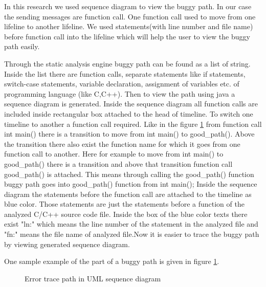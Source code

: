 In this research we used sequence diagram to view the buggy path. In our case the sending messages are function call. One function call used to move from one lifeline to another lifeline. We used statements(with line number and file name) before function call into the lifeline which will help the user to view the buggy path easily.

Through the static analysis engine buggy path can be found as a list of string. Inside the list there are function calls, separate statements like if statements, switch-case statements, variable declaration, assignment of variables etc. of programming language (like C,C++). Then to view the path using java a sequence diagram is generated. Inside the sequence diagram all function calls are included inside rectangular box attached to the head of timeline. To switch one timeline to another a function call required. Like in the figure \ref{Error_trace_path} from function call int main() there is a transition to move from int main() to good\_path(). Above the transition there also exist the function name for which it goes from one function call to another. Here for example to move from int main() to good\_path() there is a transition and above that transition function call good\_path() is attached. This means through calling the good\_path() function buggy path goes into good\_path() function from int main(); Inside the sequence diagram the statements before the function call are attached to the timeline as blue color. Those statements are just the statements before a function of the analyzed C/C++ source code file. Inside the box of the blue color texts there exist "ln:" which means the line number of the statement in the analyzed file and "fn:" means the file name of analyzed file.Now it is easier to trace the buggy path by viewing generated sequence diagram.

 One sample example of the part of a buggy path is given in figure \ref{Error_trace_path}.
\begin{figure}[htbp]
	\centering
	\label{Error_trace_path}
	\caption{Error trace path in UML sequence diagram}
\end{figure}


